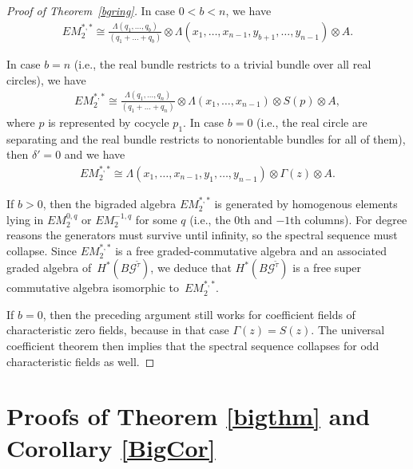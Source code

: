 \documentclass[pdftex]{sigma}
\numberwithin{equation}{section}
\begin{document}
\begin{proof}[Proof of Theorem~\ref{bgring}]
In case $0<b<n$, we have \begin{gather*}EM_2^{*,*} \cong \frac{\Lambda(q_1,\dots,q_b)}{(q_1+\dots+q_b)} \otimes \Lambda(x_1,\dots,x_{n-1},y_{b+1},\dots,y_{n-1}) \otimes A.\end{gather*}

In case $b=n$ (i.e., the real bundle restricts to a trivial bundle over all real circles), we have
\begin{gather*} EM_2^{*,*} \cong \frac{\Lambda(q_1,\dots,q_n)}{(q_1+\dots+q_n)} \otimes \Lambda(x_1,\dots,x_{n-1})\otimes S(p) \otimes A, \end{gather*}
where $p$ is represented by cocycle $p_1$.
In case $b=0$ (i.e., the real circle are separating and the real bundle restricts to nonorientable bundles for all of them), then $\delta' =0$ and we have
 \begin{gather*}EM_2^{*,*} \cong \Lambda(x_1,\dots,x_{n-1},y_{1},\dots,y_{n-1}) \otimes \Gamma(z) \otimes A.\end{gather*}

If $b>0$, then the bigraded algebra $EM_2^{*,*}$ is generated by homogenous elements lying in $EM_2^{0,q}$ or $EM_2^{-1,q}$ for some $q$ (i.e., the $0$th and $-1$th columns). For degree reasons the generators must survive until inf\/inity, so the spectral sequence must collapse. Since $EM_2^{*,*}$ is a free graded-commutative algebra and an associated graded algebra of~$H^*(B{\mathcal G}^{\tilde{\tau}})$, we deduce that $H^*(B{\mathcal G}^{\tilde{\tau}})$ is a free super commutative algebra isomorphic to~$EM_2^{*,*}$.

If $b=0$, then the preceding argument still works for coef\/f\/icient f\/ields of characteristic zero f\/ields, because in that case $\Gamma(z) = S(z)$. The universal coef\/f\/icient theorem then implies that the spectral sequence collapses for odd characteristic f\/ields as well.
\end{proof}

\section{Proofs of Theorem \ref{bigthm} and Corollary \ref{BigCor}}
\end{document}
